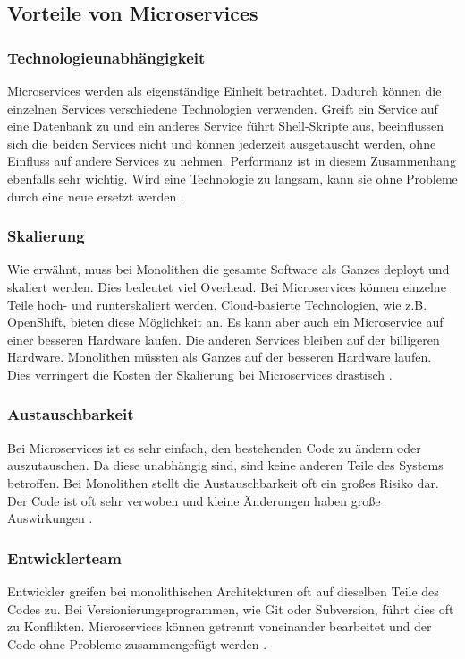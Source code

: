 \subsection{Vorteile von Microservices}
\subsubsection{Technologieunabhängigkeit}
Microservices werden als eigenständige Einheit betrachtet. Dadurch können die einzelnen Services verschiedene Technologien verwenden. Greift ein Service auf eine Datenbank zu und ein anderes Service führt Shell-Skripte aus, beeinflussen sich die beiden Services nicht und können jederzeit ausgetauscht werden, ohne Einfluss auf andere Services zu nehmen. Performanz ist in diesem Zusammenhang ebenfalls sehr wichtig. Wird eine Technologie zu langsam, kann sie ohne Probleme durch eine neue ersetzt werden \cite{Newman2015}.

\subsubsection{Skalierung}
Wie erwähnt, muss bei Monolithen die gesamte Software als Ganzes deployt und skaliert werden. Dies bedeutet viel Overhead. Bei Microservices können einzelne Teile hoch- und runterskaliert werden. Cloud-basierte Technologien, wie z.B. OpenShift, bieten diese Möglichkeit an. Es kann aber auch ein Microservice auf einer besseren Hardware laufen. Die anderen Services bleiben auf der billigeren Hardware. Monolithen müssten als Ganzes auf der besseren Hardware laufen. Dies verringert die Kosten der Skalierung bei Microservices drastisch \cite{Newman2015}.

\subsubsection{Austauschbarkeit}
Bei Microservices ist es sehr einfach, den bestehenden Code zu ändern oder auszutauschen. Da diese unabhängig sind, sind keine anderen Teile des Systems betroffen. Bei Monolithen stellt die Austauschbarkeit oft ein großes Risiko dar. Der Code ist oft sehr verwoben und kleine Änderungen haben große Auswirkungen \cite{Newman2015}.

\subsubsection{Entwicklerteam}
Entwickler greifen bei monolithischen Architekturen oft auf dieselben Teile des Codes zu. Bei Versionierungsprogrammen, wie Git oder Subversion, führt dies oft zu Konflikten.
Microservices können getrennt voneinander bearbeitet und der Code ohne Probleme zusammengefügt werden \cite{Newman2015}.



